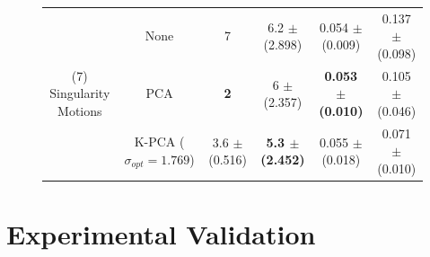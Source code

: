 \documentclass[letterpaper, 10 pt, conference,fleqn]{ieeeconf}
\begin{document}
\begin{figure}[!ht]
\begin{minipage}[b]{0.7\textwidth}
{\begin{tabular}{cc|cc|cc}
	\multicolumn{1}{c}{\multirow{3}{*}{(7) Singularity Motions}} & None & 7 & 6.2 $\pm$ (2.898) & 0.054 $\pm$ (0.009) & 0.137 $\pm$ (0.098)  \\
    \multicolumn{1}{c}{\multirow{3}{*}{($N=10,M=1467$)}} & PCA & \textbf{2} & 6 $\pm$ (2.357) & \textbf{ 0.053 $\pm$ (0.010) } & \cellcolor{blue!10} 0.105 $\pm$ (0.046) \\	
	& K-PCA ($\sigma_{opt} = 1.769$) & 3.6 $\pm$ (0.516) & \textbf{5.3 $\pm$ (2.452)} & 0.055 $\pm$ (0.018) & \cellcolor{blue!15} 0.071 $\pm$ (0.010)   \\ \hline\hline
\end{tabular}}
    \end{minipage}
    \vspace{-20pt}
\end{figure}


\section{Experimental Validation} \label{Sec:Exp}
\end{document}
